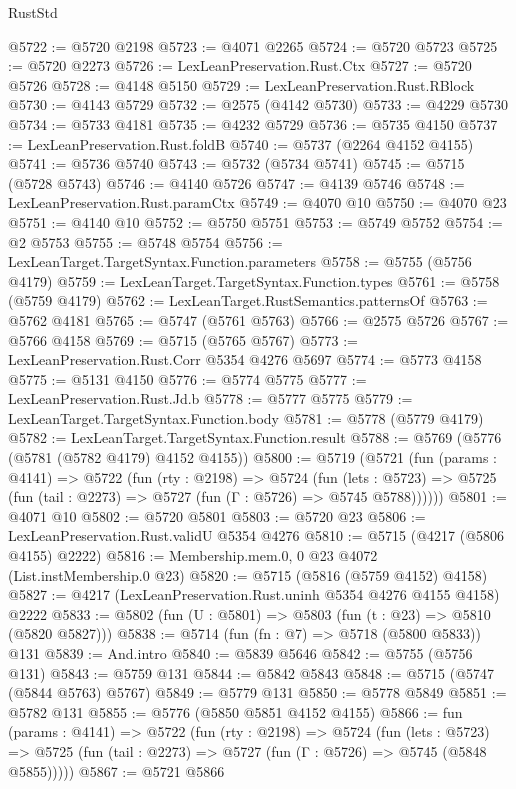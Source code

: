 \begin{lexlean}{RustStd}
\begin{coremodule}
@5722 := @5720 @2198
@5723 := @4071 @2265
@5724 := @5720 @5723
@5725 := @5720 @2273
@5726 := LexLeanPreservation.Rust.Ctx
@5727 := @5720 @5726
@5728 := @4148 @5150
@5729 := LexLeanPreservation.Rust.RBlock
@5730 := @4143 @5729
@5732 := @2575 (@4142 @5730)
@5733 := @4229 @5730
@5734 := @5733 @4181
@5735 := @4232 @5729
@5736 := @5735 @4150
@5737 := LexLeanPreservation.Rust.foldB
@5740 := @5737 (@2264 @4152 @4155)
@5741 := @5736 @5740
@5743 := @5732 (@5734 @5741)
@5745 := @5715 (@5728 @5743)
@5746 := @4140 @5726
@5747 := @4139 @5746
@5748 := LexLeanPreservation.Rust.paramCtx
@5749 := @4070 @10
@5750 := @4070 @23
@5751 := @4140 @10
@5752 := @5750 @5751
@5753 := @5749 @5752
@5754 := @2 @5753
@5755 := @5748 @5754
@5756 := LexLeanTarget.TargetSyntax.Function.parameters
@5758 := @5755 (@5756 @4179)
@5759 := LexLeanTarget.TargetSyntax.Function.types
@5761 := @5758 (@5759 @4179)
@5762 := LexLeanTarget.RustSemantics.patternsOf
@5763 := @5762 @4181
@5765 := @5747 (@5761 @5763)
@5766 := @2575 @5726
@5767 := @5766 @4158
@5769 := @5715 (@5765 @5767)
@5773 := LexLeanPreservation.Rust.Corr @5354 @4276 @5697
@5774 := @5773 @4158
@5775 := @5131 @4150
@5776 := @5774 @5775
@5777 := LexLeanPreservation.Rust.Jd.b
@5778 := @5777 @5775
@5779 := LexLeanTarget.TargetSyntax.Function.body
@5781 := @5778 (@5779 @4179)
@5782 := LexLeanTarget.TargetSyntax.Function.result
@5788 := @5769 (@5776 (@5781 (@5782 @4179) @4152 @4155))
@5800 := @5719
    (@5721
      (fun (params : @4141) =>
      @5722
        (fun (rty : @2198) =>
        @5724
          (fun (lets : @5723) =>
          @5725 (fun (tail : @2273) => @5727 (fun (Γ : @5726) => @5745 @5788))))))
@5801 := @4071 @10
@5802 := @5720 @5801
@5803 := @5720 @23
@5806 := LexLeanPreservation.Rust.validU @5354 @4276
@5810 := @5715 (@4217 (@5806 @4155) @2222)
@5816 := Membership.mem.{0, 0} @23 @4072 (List.instMembership.{0} @23)
@5820 := @5715 (@5816 (@5759 @4152) @4158)
@5827 := @4217 (LexLeanPreservation.Rust.uninh @5354 @4276 @4155 @4158) @2222
@5833 := @5802 (fun (U : @5801) => @5803 (fun (t : @23) => @5810 (@5820 @5827)))
@5838 := @5714 (fun (fn : @7) => @5718 (@5800 @5833)) @131
@5839 := And.intro
@5840 := @5839 @5646
@5842 := @5755 (@5756 @131)
@5843 := @5759 @131
@5844 := @5842 @5843
@5848 := @5715 (@5747 (@5844 @5763) @5767)
@5849 := @5779 @131
@5850 := @5778 @5849
@5851 := @5782 @131
@5855 := @5776 (@5850 @5851 @4152 @4155)
@5866 := fun (params : @4141) =>
  @5722
    (fun (rty : @2198) =>
    @5724
      (fun (lets : @5723) =>
      @5725 (fun (tail : @2273) => @5727 (fun (Γ : @5726) => @5745 (@5848 @5855)))))
@5867 := @5721 @5866

\end{coremodule}
\end{lexlean}
